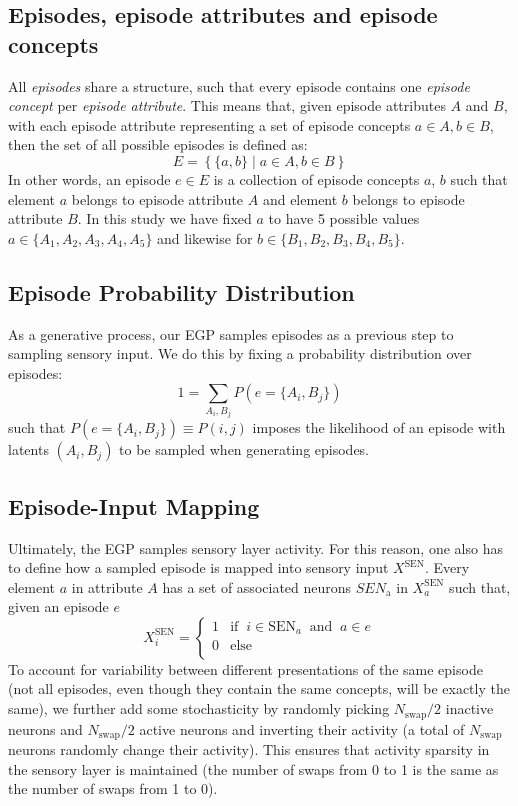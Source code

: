 \documentclass{article}
\begin{document}
\subsection*{Episodes, episode attributes and episode concepts}
All \textit{episodes} share a structure, such that every episode contains one \textit{episode concept} per \textit{episode attribute}. This means that, given episode attributes $A$ and $B$, with each episode attribute representing a set of episode concepts $a\in A, b\in B$, then the set of all possible episodes is defined as:
\begin{equation}
    E = \left\{ \{a, b\} \mid a \in A, b \in B \right\}
\end{equation}
In other words, an episode $e\in E$ is a collection of episode concepts $a$, $b$ such that element $a$ belongs to episode attribute  $A$ and element $b$ belongs to episode attribute $B$. In this study we have fixed $a$ to have 5 possible values $a\in \{A_1, A_2, A_3, A_4, A_5\}$ and likewise for $b\in \{B_1, B_2, B_3, B_4, B_5\}$.
\newline\newline
\subsection*{Episode Probability Distribution}
As a generative process, our EGP samples episodes as a previous step to sampling sensory input. We do this by fixing a probability distribution over episodes:
\begin{equation}
    1 = \sum_{A_i, B_j}P(e = \{A_i, B_j\}) 
\end{equation}
such that $P(e = \{A_i, B_j\}) \equiv P(i,j)$ imposes the likelihood of an episode with latents $(A_i, B_j)$ to be sampled when generating episodes.
\subsection*{Episode-Input Mapping}
Ultimately, the EGP samples sensory layer activity. For this reason, one also has to define how a sampled episode is mapped into sensory input $X^\textrm{SEN}$. Every element $a$ in attribute $A$ has a set of associated neurons $SEN_\textrm{a}$ in $X^\textrm{SEN}_a$ such that, given an episode $e$
\begin{equation}
     X^\textrm{SEN}_i = \begin{cases} 
      1 & \textrm{if} \;\; i \in \textrm{SEN}_a \;\;\textrm{and}\;\; a \in e\\ 
      0 & \textrm{else} \\
   \end{cases}
\end{equation}    
To account for variability between different presentations of the same episode (not all episodes, even though they contain the same concepts, will be exactly the same), we further add some stochasticity by randomly picking $N_\textrm{swap}/2$ inactive neurons and $N_\textrm{swap}/2$ active neurons and inverting their activity (a total of $N_\textrm{swap}$ neurons randomly change their activity). This ensures that activity sparsity in the sensory layer is maintained (the number of swaps from 0 to 1 is the same as the number of swaps from 1 to 0).
\end{document}
